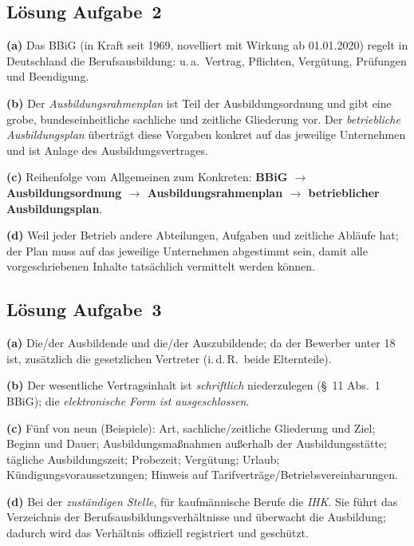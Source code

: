 \documentclass[11pt, a4paper]{article}
\begin{document}
\subsection*{Lösung Aufgabe~2}
\begin{loesung}
\textbf{(a)} Das BBiG (in Kraft seit 1969, novelliert mit Wirkung ab 01.01.2020) regelt in
Deutschland die Berufsausbildung: u.\,a.\ Vertrag, Pflichten, Vergütung, Prüfungen und
Beendigung.

\textbf{(b)} Der \emph{Ausbildungsrahmenplan} ist Teil der Ausbildungsordnung und gibt eine
grobe, bundeseinheitliche sachliche und zeitliche Gliederung vor. Der \emph{betriebliche
Ausbildungsplan} überträgt diese Vorgaben konkret auf das jeweilige Unternehmen und ist
Anlage des Ausbildungsvertrages.

\textbf{(c)} Reihenfolge vom Allgemeinen zum Konkreten: \textbf{BBiG $\rightarrow$
Ausbildungsordnung $\rightarrow$ Ausbildungsrahmenplan $\rightarrow$ betrieblicher
Ausbildungsplan}.

\textbf{(d)} Weil jeder Betrieb andere Abteilungen, Aufgaben und zeitliche Abläufe hat; der
Plan muss auf das jeweilige Unternehmen abgestimmt sein, damit alle vorgeschriebenen
Inhalte tatsächlich vermittelt werden können.
\end{loesung}

\subsection*{Lösung Aufgabe~3}
\begin{loesung}
\textbf{(a)} Die/der Ausbildende und die/der Auszubildende; da der Bewerber unter 18 ist,
zusätzlich die gesetzlichen Vertreter (i.\,d.\,R.\ beide Elternteile).

\textbf{(b)} Der wesentliche Vertragsinhalt ist \emph{schriftlich} niederzulegen (\S~11
Abs.~1 BBiG); die \emph{elektronische Form ist ausgeschlossen}.

\textbf{(c)} Fünf von neun (Beispiele): Art, sachliche/zeitliche Gliederung und Ziel;
Beginn und Dauer; Ausbildungsmaßnahmen außerhalb der Ausbildungsstätte; tägliche
Ausbildungszeit; Probezeit; Vergütung; Urlaub; Kündigungsvoraussetzungen; Hinweis auf
Tarifverträge/Betriebsvereinbarungen.

\textbf{(d)} Bei der \emph{zuständigen Stelle}, für kaufmännische Berufe die \emph{IHK}. Sie
führt das Verzeichnis der Berufsausbildungsverhältnisse und überwacht die Ausbildung;
dadurch wird das Verhältnis offiziell registriert und geschützt.
\end{loesung}
\end{document}
